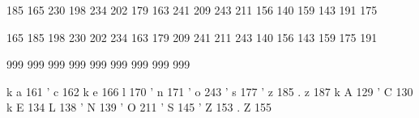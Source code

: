 

\startmapping[pl0]

 185 165  %
 230 198  %
 234 202  %
 179 163  %
 241 209  %
 243 211  %
 156 140  %
 159 143  %
 191 175  %

 165 185  %
 198 230  %
 202 234  %
 163 179  %
 209 241  %
 211 243  %
 140 156  %
 143 159  %
 175 191  %

\stopmapping 

\startmapping[pl0]

 999  %
 999  %
 999  %
 999  %
 999  %
 999  %
 999  %
 999  %
 999  %

\stopmapping 

\startencoding[pl0]

  k a 161  %
  ' c 162  %
  k e 166  %
 l 170  %
  ' n 171  %
  ' o 243  %
  ' s 177  %
  ' z 185  %
  . z 187  %
  k A 129  %
  ' C 130  %
  k E 134  %
 L 138  %
  ' N 139  %
  ' O 211  %
  ' S 145  %
  ' Z 153  %
  . Z 155  %

\stopencoding 

